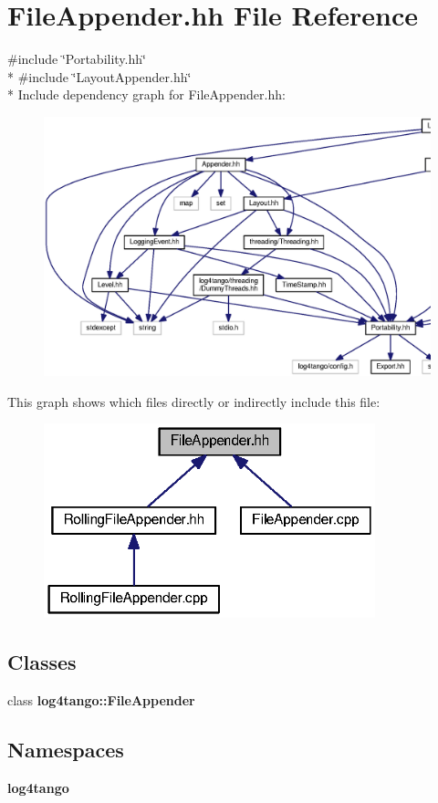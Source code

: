 \section{File\-Appender.\-hh File Reference}
\label{FileAppender_8hh}
{\ttfamily \#include \char`\"{}Portability.\-hh\char`\"{}}\\*
{\ttfamily \#include \char`\"{}Layout\-Appender.\-hh\char`\"{}}\\*
Include dependency graph for File\-Appender.\-hh\-:
\nopagebreak
\begin{figure}[H]
\begin{center}
\leavevmode
\includegraphics[width=350pt]{dd/d17/FileAppender_8hh__incl}
\end{center}
\end{figure}
This graph shows which files directly or indirectly include this file\-:
\nopagebreak
\begin{figure}[H]
\begin{center}
\leavevmode
\includegraphics[width=272pt]{d0/d7d/FileAppender_8hh__dep__incl}
\end{center}
\end{figure}
\subsection*{Classes}
\begin{DoxyCompactItemize}
\item 
class {\bf log4tango\-::\-File\-Appender}
\end{DoxyCompactItemize}
\subsection*{Namespaces}
\begin{DoxyCompactItemize}
\item 
{\bf log4tango}
\end{DoxyCompactItemize}
